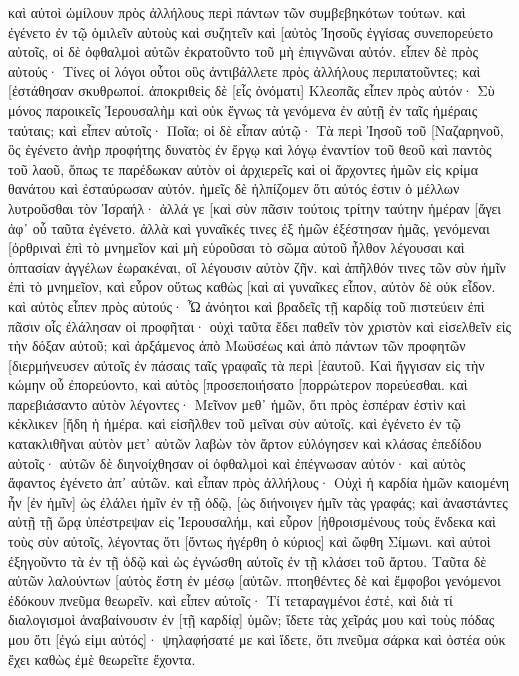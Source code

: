 καὶ αὐτοὶ ὡμίλουν πρὸς ἀλλήλους περὶ πάντων τῶν συμβεβηκότων τούτων. 
καὶ ἐγένετο ἐν τῷ ὁμιλεῖν αὐτοὺς καὶ συζητεῖν καὶ [αὐτὸς Ἰησοῦς ἐγγίσας συνεπορεύετο αὐτοῖς, 
οἱ δὲ ὀφθαλμοὶ αὐτῶν ἐκρατοῦντο τοῦ μὴ ἐπιγνῶναι αὐτόν. 
εἶπεν δὲ πρὸς αὐτούς· Τίνες οἱ λόγοι οὗτοι οὓς ἀντιβάλλετε πρὸς ἀλλήλους περιπατοῦντες; καὶ [ἐστάθησαν σκυθρωποί. 
ἀποκριθεὶς δὲ [εἷς ὀνόματι] Κλεοπᾶς εἶπεν πρὸς αὐτόν· Σὺ μόνος παροικεῖς Ἰερουσαλὴμ καὶ οὐκ ἔγνως τὰ γενόμενα ἐν αὐτῇ ἐν ταῖς ἡμέραις ταύταις; 
καὶ εἶπεν αὐτοῖς· Ποῖα; οἱ δὲ εἶπαν αὐτῷ· Τὰ περὶ Ἰησοῦ τοῦ [Ναζαρηνοῦ, ὃς ἐγένετο ἀνὴρ προφήτης δυνατὸς ἐν ἔργῳ καὶ λόγῳ ἐναντίον τοῦ θεοῦ καὶ παντὸς τοῦ λαοῦ, 
ὅπως τε παρέδωκαν αὐτὸν οἱ ἀρχιερεῖς καὶ οἱ ἄρχοντες ἡμῶν εἰς κρίμα θανάτου καὶ ἐσταύρωσαν αὐτόν. 
ἡμεῖς δὲ ἠλπίζομεν ὅτι αὐτός ἐστιν ὁ μέλλων λυτροῦσθαι τὸν Ἰσραήλ· ἀλλά γε [καὶ σὺν πᾶσιν τούτοις τρίτην ταύτην ἡμέραν [ἄγει ἀφ᾽ οὗ ταῦτα ἐγένετο. 
ἀλλὰ καὶ γυναῖκές τινες ἐξ ἡμῶν ἐξέστησαν ἡμᾶς, γενόμεναι [ὀρθριναὶ ἐπὶ τὸ μνημεῖον 
καὶ μὴ εὑροῦσαι τὸ σῶμα αὐτοῦ ἦλθον λέγουσαι καὶ ὀπτασίαν ἀγγέλων ἑωρακέναι, οἳ λέγουσιν αὐτὸν ζῆν. 
καὶ ἀπῆλθόν τινες τῶν σὺν ἡμῖν ἐπὶ τὸ μνημεῖον, καὶ εὗρον οὕτως καθὼς [καὶ αἱ γυναῖκες εἶπον, αὐτὸν δὲ οὐκ εἶδον. 
καὶ αὐτὸς εἶπεν πρὸς αὐτούς· Ὦ ἀνόητοι καὶ βραδεῖς τῇ καρδίᾳ τοῦ πιστεύειν ἐπὶ πᾶσιν οἷς ἐλάλησαν οἱ προφῆται· 
οὐχὶ ταῦτα ἔδει παθεῖν τὸν χριστὸν καὶ εἰσελθεῖν εἰς τὴν δόξαν αὐτοῦ; 
καὶ ἀρξάμενος ἀπὸ Μωϋσέως καὶ ἀπὸ πάντων τῶν προφητῶν [διερμήνευσεν αὐτοῖς ἐν πάσαις ταῖς γραφαῖς τὰ περὶ [ἑαυτοῦ. 
Καὶ ἤγγισαν εἰς τὴν κώμην οὗ ἐπορεύοντο, καὶ αὐτὸς [προσεποιήσατο [πορρώτερον πορεύεσθαι. 
καὶ παρεβιάσαντο αὐτὸν λέγοντες· Μεῖνον μεθ᾽ ἡμῶν, ὅτι πρὸς ἑσπέραν ἐστὶν καὶ κέκλικεν [ἤδη ἡ ἡμέρα. καὶ εἰσῆλθεν τοῦ μεῖναι σὺν αὐτοῖς. 
καὶ ἐγένετο ἐν τῷ κατακλιθῆναι αὐτὸν μετ᾽ αὐτῶν λαβὼν τὸν ἄρτον εὐλόγησεν καὶ κλάσας ἐπεδίδου αὐτοῖς· 
αὐτῶν δὲ διηνοίχθησαν οἱ ὀφθαλμοὶ καὶ ἐπέγνωσαν αὐτόν· καὶ αὐτὸς ἄφαντος ἐγένετο ἀπ᾽ αὐτῶν. 
καὶ εἶπαν πρὸς ἀλλήλους· Οὐχὶ ἡ καρδία ἡμῶν καιομένη ἦν [ἐν ἡμῖν] ὡς ἐλάλει ἡμῖν ἐν τῇ ὁδῷ, [ὡς διήνοιγεν ἡμῖν τὰς γραφάς; 
καὶ ἀναστάντες αὐτῇ τῇ ὥρᾳ ὑπέστρεψαν εἰς Ἰερουσαλήμ, καὶ εὗρον [ἠθροισμένους τοὺς ἕνδεκα καὶ τοὺς σὺν αὐτοῖς, 
λέγοντας ὅτι [ὄντως ἠγέρθη ὁ κύριος] καὶ ὤφθη Σίμωνι. 
καὶ αὐτοὶ ἐξηγοῦντο τὰ ἐν τῇ ὁδῷ καὶ ὡς ἐγνώσθη αὐτοῖς ἐν τῇ κλάσει τοῦ ἄρτου. 
Ταῦτα δὲ αὐτῶν λαλούντων [αὐτὸς ἔστη ἐν μέσῳ [αὐτῶν. 
πτοηθέντες δὲ καὶ ἔμφοβοι γενόμενοι ἐδόκουν πνεῦμα θεωρεῖν. 
καὶ εἶπεν αὐτοῖς· Τί τεταραγμένοι ἐστέ, καὶ διὰ τί διαλογισμοὶ ἀναβαίνουσιν ἐν [τῇ καρδίᾳ] ὑμῶν; 
ἴδετε τὰς χεῖράς μου καὶ τοὺς πόδας μου ὅτι [ἐγώ εἰμι αὐτός]· ψηλαφήσατέ με καὶ ἴδετε, ὅτι πνεῦμα σάρκα καὶ ὀστέα οὐκ ἔχει καθὼς ἐμὲ θεωρεῖτε ἔχοντα. 
